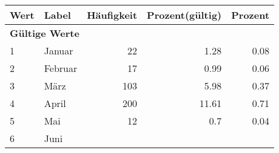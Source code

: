      \begin{longtable}{lXrrr}
     \toprule
     \textbf{Wert} & \textbf{Label} & \textbf{Häufigkeit} & \textbf{Prozent(gültig)} & \textbf{Prozent} \\
     \endhead
     \midrule
     \multicolumn{5}{l}{\textbf{Gültige Werte}}\\

     1 &
     \multicolumn{1}{X}{ Januar   } &


       \num{22} &
       \num[round-mode=places,round-precision=2]{1,28} &
         \num[round-mode=places,round-precision=2]{0,08} \\

     2 &
     \multicolumn{1}{X}{ Februar   } &


       \num{17} &
       \num[round-mode=places,round-precision=2]{0,99} &
         \num[round-mode=places,round-precision=2]{0,06} \\

     3 &
     \multicolumn{1}{X}{ März   } &


       \num{103} &
       \num[round-mode=places,round-precision=2]{5,98} &
         \num[round-mode=places,round-precision=2]{0,37} \\

     4 &
     \multicolumn{1}{X}{ April   } &


       \num{200} &
       \num[round-mode=places,round-precision=2]{11,61} &
         \num[round-mode=places,round-precision=2]{0,71} \\

     5 &
     \multicolumn{1}{X}{ Mai   } &


       \num{12} &
       \num[round-mode=places,round-precision=2]{0,7} &
         \num[round-mode=places,round-precision=2]{0,04} \\

     6 &
     \multicolumn{1}{X}{ Juni   } &



\end{longtable}
